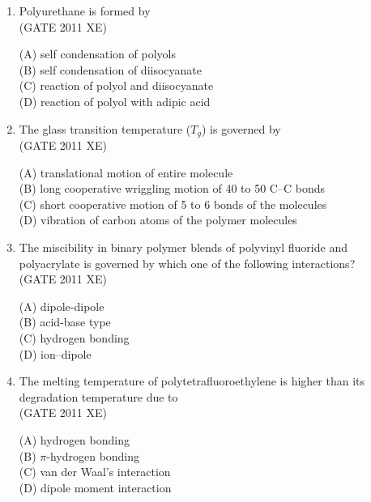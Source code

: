 \documentclass[journal,12pt,onecolumn]{IEEEtran}
\begin{document}
\begin{enumerate}[label=\arabic*)]
\item Polyurethane is formed by\\

\hfill{(GATE 2011 XE)} \\
\begin{multicols}{2}
(A) self condensation of polyols\\
(B) self condensation of diisocyanate\\
(C) reaction of polyol and diisocyanate\\
(D) reaction of polyol with adipic acid
\end{multicols}


\item The glass transition temperature ($T_g$) is governed by\\

\hfill{(GATE 2011 XE)} \\
\begin{multicols}{2}
(A) translational motion of entire molecule\\
(B) long cooperative wriggling motion of 40 to 50 C–C bonds\\
(C) short cooperative motion of 5 to 6 bonds of the molecules\\
(D) vibration of carbon atoms of the polymer molecules
\end{multicols}

\newpage 

\item The miscibility in binary polymer blends of polyvinyl fluoride and polyacrylate is governed by which one of the following interactions?\\

\hfill{(GATE 2011 XE)} \\
\begin{multicols}{4}
(A) dipole-dipole\\
(B) acid-base type\\
(C) hydrogen bonding\\
(D) ion–dipole
\end{multicols}



\item The melting temperature of polytetrafluoroethylene is higher than its degradation temperature due to\\

\hfill{(GATE 2011 XE)} \\
\begin{multicols}{4}
(A) hydrogen bonding\\
(B) $\pi$-hydrogen bonding\\
(C) van der Waal’s interaction\\
(D) dipole moment interaction
\end{multicols}


\end{enumerate}
\end{document}
